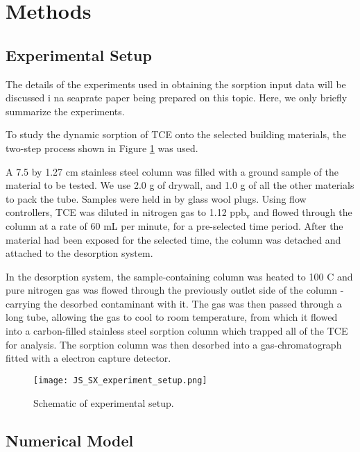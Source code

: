 \section{Methods}\label{sec:methods}

\subsection{Experimental Setup}\label{sec:experimental_method}

The details of the experiments used in obtaining the sorption input data will be discussed i na seaprate paper being prepared on this topic.
Here, we only briefly summarize the experiments.

To study the dynamic sorption of TCE onto the selected building materials, the two-step process shown in Figure \ref{fig:js_sx_setup} was used.\par

A 7.5 by 1.27 cm stainless steel column was filled with a ground sample of the material to be tested.
We use 2.0 g of drywall, and 1.0 g of all the other materials to pack the tube.
Samples were held in by glass wool plugs.
Using flow controllers, TCE was diluted in nitrogen gas to 1.12 $\mathrm{ppb_v}$ and flowed through the column at a rate of 60 mL per minute, for a pre-selected time period.
After the material had been exposed for the selected time, the column was detached and attached to the desorption system.\par

In the desorption system, the sample-containing column was heated to 100 \degree C and pure nitrogen gas was flowed through the previously outlet side of the column - carrying the desorbed contaminant with it.
The gas was then passed through a long tube, allowing the gas to cool to room temperature, from which it flowed into a carbon-filled stainless steel sorption column which trapped all of the TCE for analysis.
The sorption column was then desorbed into a gas-chromatograph fitted with a electron capture detector.\par

\begin{figure}
  \texttt{[image: JS\_SX\_experiment\_setup.png]}
  \caption{Schematic of experimental setup.} %
  \label{fig:js_sx_setup}
\end{figure}

\subsection{Numerical Model}\label{sec:model}

